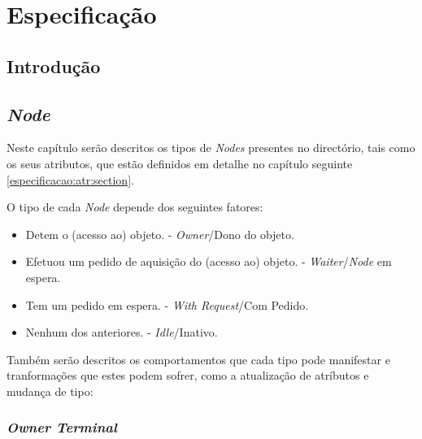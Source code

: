 \chapter{Especificação}
\label{chap:especificacao}

\section{Introdução}
\label{especificacao:sec:intro}
\section{\emph{Node}}
Neste capítulo serão descritos os tipos de \emph{Nodes} presentes no directório, tais como os seus atributos, que estão definidos em detalhe no capítulo seguinte \ref{especificacao:atr:section}.

O tipo de cada \emph{Node} depende dos seguintes fatores:
\begin{itemize}
    \item Detem o (acesso ao) objeto. - \emph{Owner}/Dono do objeto.
    \item Efetuou um pedido de aquisição do (acesso ao) objeto. - \emph{Waiter}/\emph{Node} em espera.
    \item Tem um pedido em espera. - \emph{With Request}/Com Pedido.
    \item Nenhum dos anteriores. - \emph{Idle}/Inativo.
\end{itemize}
Também serão descritos os comportamentos que cada tipo pode manifestar e tranformações que estes podem sofrer, como a atualização de atríbutos e mudança de tipo:


\subsection{\emph{Owner Terminal}}
\label{especificacao:nodes:owner_terminal}


